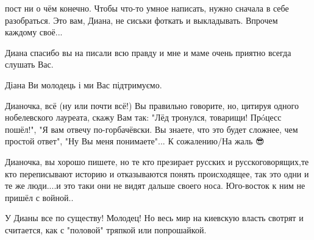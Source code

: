 \begin{itemize}
пост ни о чём конечно. Чтобы что-то умное написать, нужно сначала в себе разобраться. Это вам, Диана, не сиськи фоткать и выкладывать. Впрочем каждому своё...

 
Диана спасибо вы на писали всю правду и мне и маме очень приятно всегда слушать Вас.

 
Діана Ви молодець і ми Вас підтримуємо.


Дианочка, всё (ну или почти всё!) Вы правильно говорите, но, цитируя одного
нобелевского лауреата, скажу Вам так: "Лёд тронулся, товарищи! Прóцесс пошёл!",
"Я вам отвечу по-горбачёвски. Вы знаете, что это будет сложнее, чем простой
ответ", "Ну Вы меня понимаете"... К сожалению/На жаль 😎

 

Дианочка, вы хорошо пишете, но те кто презирает русских и русскоговорящих,те
кто переписывают историю и отказываются понять происходящее, так это одни и те
же люди....и это таки они не видят дальше своего носа. Юго-восток к ним не
пришёл с войной..



У Дианы все по существу! Молодец! Но весь мир на киевскую власть свотрят и
считается, как с "половой" тряпкой или попрошайкой.


 

\end{itemize}
